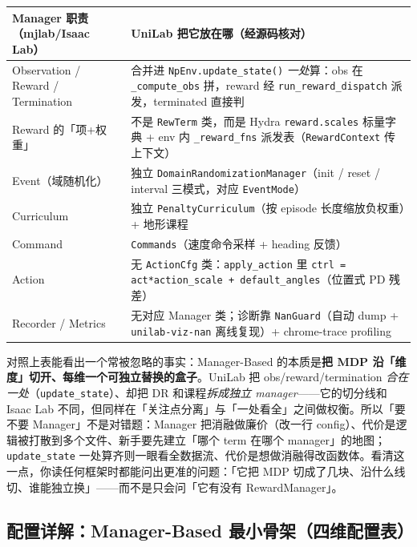 \begin{center}
\small
\begin{tabular}{@{}p{3.6cm}p{10.0cm}@{}}
\toprule
Manager 职责（mjlab/Isaac Lab） & UniLab 把它放在哪（经源码核对） \\
\midrule
Observation / Reward / Termination & 合并进 \verb|NpEnv.update_state()| \emph{一处}算：obs 在 \verb|_compute_obs| 拼，reward 经 \verb|run_reward_dispatch| 派发，terminated 直接判 \\
Reward 的「项+权重」 & 不是 \verb|RewTerm| 类，而是 Hydra \verb|reward.scales| 标量字典 + env 内 \verb|_reward_fns| 派发表（\verb|RewardContext| 传上下文） \\
Event（域随机化） & 独立 \verb|DomainRandomizationManager|（init / reset / interval 三模式，对应 \verb|EventMode|） \\
Curriculum & 独立 \verb|PenaltyCurriculum|（按 episode 长度缩放负权重）+ 地形课程 \\
Command & \verb|Commands|（速度命令采样 + heading 反馈） \\
Action & 无 \verb|ActionCfg| 类：\verb|apply_action| 里 \verb|ctrl = act*action_scale + default_angles|（位置式 PD 残差） \\
Recorder / Metrics & 无对应 Manager 类；诊断靠 \verb|NanGuard|（自动 dump + \verb|unilab-viz-nan| 离线复现）+ chrome-trace profiling \\
\bottomrule
\end{tabular}
\end{center}

\begin{insight}\label{ins:rlmc-eco-manager-granularity}
对照上表能看出一个常被忽略的事实：Manager-Based 的本质是\textbf{把 MDP 沿「维度」切开、每维一个可独立替换的盒子}。UniLab 把 obs/reward/termination \emph{合在一处}（\verb|update_state|）、却把 DR 和课程\emph{拆成独立 manager}——它的切分线和 Isaac Lab 不同，但同样在「关注点分离」与「一处看全」之间做权衡。所以「要不要 Manager」不是对错题：Manager 把消融做廉价（改一行 config）、代价是逻辑被打散到多个文件、新手要先建立「哪个 term 在哪个 manager」的地图；\verb|update_state| 一处算齐则一眼看全数据流、代价是想做消融得改函数体。看清这一点，你读任何框架时都能问出更准的问题：「它把 MDP 切成了几块、沿什么线切、谁能独立换」——而不是只会问「它有没有 RewardManager」。
\end{insight}

\subsection{配置详解：Manager-Based 最小骨架（四维配置表）}


